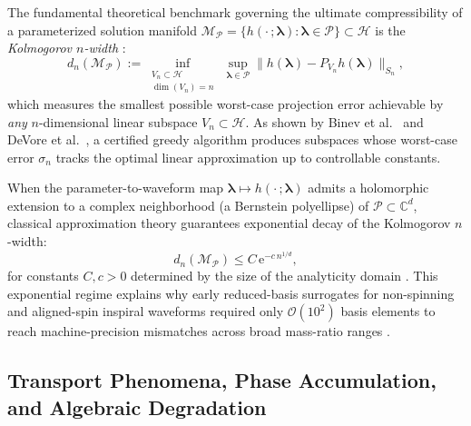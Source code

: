 \documentclass[11pt, a4paper]{article}
\begin{document}
The fundamental theoretical benchmark governing the ultimate compressibility of a parameterized solution manifold $\mathcal{M}_{\mathcal{P}} = \{ h(\cdot\,; \boldsymbol{\lambda}) : \boldsymbol{\lambda} \in \mathcal{P} \} \subset \mathcal{H}$ is the \emph{Kolmogorov $n$-width} \cite{Pinkus1985}:
\begin{equation}
d_n(\mathcal{M}_{\mathcal{P}}) := \inf_{\substack{V_n \subset \mathcal{H} \\ \dim(V_n) = n}} \, \sup_{\boldsymbol{\lambda} \in \mathcal{P}} \bigl\| h(\boldsymbol{\lambda}) - P_{V_n} h(\boldsymbol{\lambda}) \bigr\|_{S_n} ,
\label{eq:kolmogorov_nwidth}
\end{equation}
which measures the smallest possible worst-case projection error achievable by \emph{any} $n$-dimensional linear subspace $V_n \subset \mathcal{H}$. As shown by Binev et al.\ \cite{Binev2011} and DeVore et al.\ \cite{DeVore2013}, a certified greedy algorithm produces subspaces whose worst-case error $\sigma_n$ tracks the optimal linear approximation up to controllable constants.

When the parameter-to-waveform map $\boldsymbol{\lambda} \mapsto h(\cdot\,; \boldsymbol{\lambda})$ admits a holomorphic extension to a complex neighborhood (a Bernstein polyellipse) of $\mathcal{P} \subset \mathbb{C}^d$, classical approximation theory guarantees exponential decay of the Kolmogorov $n$-width:
\begin{equation}
d_n(\mathcal{M}_{\mathcal{P}}) \le C \, \mathrm{e}^{-c \, n^{1/d}} ,
\label{eq:exponential_nwidth}
\end{equation}
for constants $C, c > 0$ determined by the size of the analyticity domain \cite{Cohen2015}. This exponential regime explains why early reduced-basis surrogates for non-spinning and aligned-spin inspiral waveforms required only $\mathcal{O}(10^2)$ basis elements to reach machine-precision mismatches across broad mass-ratio ranges \cite{Field2011,Field2014}.

\subsection{Transport Phenomena, Phase Accumulation, and Algebraic Degradation}
\end{document}
